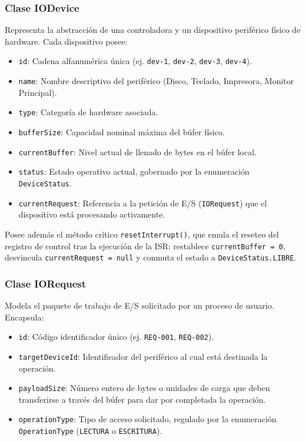 \documentclass[11pt,letterpaper]{article}
\begin{document}
\subsubsection{Clase IODevice}
Representa la abstracción de una controladora y un dispositivo periférico físico de hardware. Cada dispositivo posee:
\begin{itemize}
    \item \texttt{id}: Cadena alfanumérica única (ej. \texttt{dev-1}, \texttt{dev-2}, \texttt{dev-3}, \texttt{dev-4}).
    \item \texttt{name}: Nombre descriptivo del periférico (Disco, Teclado, Impresora, Monitor Principal).
    \item \texttt{type}: Categoría de hardware asociada.
    \item \texttt{bufferSize}: Capacidad nominal máxima del búfer físico.
    \item \texttt{currentBuffer}: Nivel actual de llenado de bytes en el búfer local.
    \item \texttt{status}: Estado operativo actual, gobernado por la enumeración \texttt{DeviceStatus}.
    \item \texttt{currentRequest}: Referencia a la petición de E/S (\texttt{IORequest}) que el dispositivo está procesando activamente.
\end{itemize}
Posee además el método crítico \texttt{resetInterrupt()}, que emula el reseteo del registro de control tras la ejecución de la ISR: restablece \texttt{currentBuffer = 0}, desvincula \texttt{currentRequest = null} y conmuta el estado a \texttt{DeviceStatus.LIBRE}.

\subsubsection{Clase IORequest}
Modela el paquete de trabajo de E/S solicitado por un proceso de usuario. Encapsula:
\begin{itemize}
    \item \texttt{id}: Código identificador único (ej. \texttt{REQ-001}, \texttt{REQ-002}).
    \item \texttt{targetDeviceId}: Identificador del periférico al cual está destinada la operación.
    \item \texttt{payloadSize}: Número entero de bytes o unidades de carga que deben transferirse a través del búfer para dar por completada la operación.
    \item \texttt{operationType}: Tipo de acceso solicitado, regulado por la enumeración \texttt{OperationType} (\texttt{LECTURA} o \texttt{ESCRITURA}).
\end{itemize}
\end{document}
